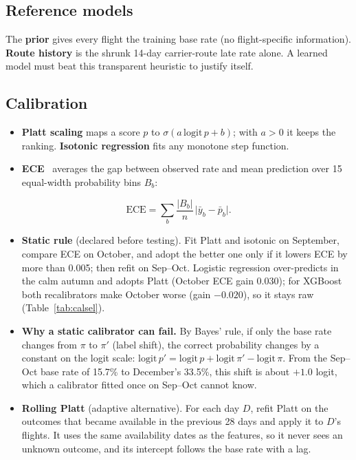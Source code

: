 \documentclass[conference]{IEEEtran}
\begin{document}
\subsection{Reference models}
The \textbf{prior} gives every flight the training base rate (no flight-specific information). \textbf{Route history} is the shrunk 14-day carrier-route late rate alone. A learned model must beat this transparent heuristic to justify itself.

\subsection{Calibration}
\begin{itemize}
\item \textbf{Platt scaling} maps a score $p$ to $\sigma(a\,\mathrm{logit}\,p+b)$; with $a>0$ it keeps the ranking. \textbf{Isotonic regression} fits any monotone step function.
\item \textbf{ECE}~\cite{guo2017calibration} averages the gap between observed rate and mean prediction over 15 equal-width probability bins $B_b$:
\end{itemize}
\[
\mathrm{ECE}=\textstyle\sum_b\frac{|B_b|}{n}\,\big|\bar y_b-\bar p_b\big| .
\]
\begin{itemize}
\item \textbf{Static rule} (declared before testing). Fit Platt and isotonic on September, compare ECE on October, and adopt the better one only if it lowers ECE by more than 0.005; then refit on Sep--Oct. Logistic regression over-predicts in the calm autumn and adopts Platt (October ECE gain 0.030); for XGBoost both recalibrators make October worse (gain $-0.020$), so it stays raw (Table~\ref{tab:calsel}).
\item \textbf{Why a static calibrator can fail.} By Bayes' rule, if only the base rate changes from $\pi$ to $\pi'$ (label shift), the correct probability changes by a constant on the logit scale: $\mathrm{logit}\,p'=\mathrm{logit}\,p+\mathrm{logit}\,\pi'-\mathrm{logit}\,\pi$. From the Sep--Oct base rate of 15.7\% to December's 33.5\%, this shift is about $+1.0$ logit, which a calibrator fitted once on Sep--Oct cannot know.
\item \textbf{Rolling Platt} (adaptive alternative). For each day $D$, refit Platt on the outcomes that became available in the previous 28 days and apply it to $D$'s flights. It uses the same availability dates as the features, so it never sees an unknown outcome, and its intercept follows the base rate with a lag.
\end{itemize}
\end{document}
